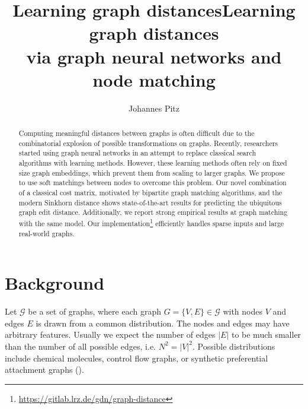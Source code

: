 \documentclass[a4paper,10pt]{article}
\title{Learning graph distances} %
\author{Johannes Pitz} %
\institute{\textit{Guided Research: Data Analytics and Machine Learning Group  \protect\\ TUM Department of Informatics}}
\begin{document}
\title{Learning graph distances \protect\\ via graph neural networks and node matching}
\maketitle

\begin{abstract}


Computing meaningful distances between graphs is often difficult due to the combinatorial explosion of possible transformations on graphs. Recently, researchers started using graph neural networks in an attempt to replace classical search algorithms with learning methods. However, these learning methods often rely on fixed size graph embeddings, which prevent them from scaling to larger graphs. We propose to use soft matchings between nodes to overcome this problem. Our novel combination of a classical cost matrix, motivated by bipartite graph matching algorithms, and the modern Sinkhorn distance shows state-of-the-art results for predicting the ubiquitous graph edit distance. Additionally, we report strong empirical results at graph matching with the same model. Our implementation\footnote{\url{https://gitlab.lrz.de/gdn/graph-distance}} efficiently handles sparse inputs and large real-world graphs.






\end{abstract}



\section{Background}

Let $\mathcal{G}$ be a set of graphs, where each graph $G = \{V, E\} \in \mathcal{G}$ with nodes $V$ and edges $E$ is drawn from a common distribution. The nodes and edges may have arbitrary features. Usually we expect the number of edges $\vert E \vert$ to be much smaller than the number of all possible edges, i.e. $N^2 = \vert V \vert ^2$. Possible distributions include chemical molecules, control flow graphs, or synthetic preferential attachment graphs (\citealp{pref_att2002}).
\end{document}
